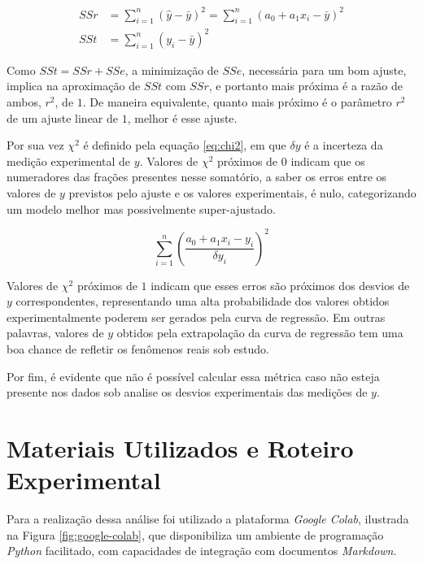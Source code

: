 \documentclass{article}
\begin{document}
\begin{align}
    \label{eq:ssr}
    SSr &= \sum_{i=1}^n \left(\hat y - \bar{y}\right)^2 = \sum_{i=1}^n \left(a_0 + a_1
    x_i - \bar{y}\right)^2 \\[1.5ex]
    \label{eq:sst}
    SSt &= \sum_{i = 1}^n \left(y_i - \bar{y}\right)^2
\end{align}

Como $SSt = SSr + SSe$, a minimização de $SSe$, necessária para um bom ajuste,
implica na aproximação de $SSt$ com $SSr$, e portanto mais próxima é a razão de
ambos, $r^2$, de $1$. De maneira equivalente, quanto mais próximo é o parâmetro
$r^2$ de um ajuste linear de $1$, melhor é esse ajuste.

Por sua vez $\chi^2$ é definido pela equação \eqref{eq:chi2}, em que $\delta y$
é a incerteza da medição experimental de $y$. Valores de $\chi^2$ próximos de
$0$ indicam que os numeradores das frações presentes nesse somatório, a saber os
erros entre os valores de $y$ previstos pelo ajuste e os valores experimentais,
é nulo, categorizando um modelo melhor mas possivelmente super-ajustado.

\begin{equation}
    \label{eq:chi2}
    \sum_{i=1}^n \left(\frac{a_0 + a_1x_i - y_i}{\delta y_i}\right)^2
\end{equation}

Valores de $\chi^2$ próximos de $1$ indicam que esses erros são próximos dos
desvios de $y$ correspondentes, representando uma alta probabilidade dos valores
obtidos experimentalmente poderem ser gerados pela curva de regressão. Em outras
palavras, valores de $y$ obtidos pela extrapolação da curva de regressão tem uma
boa chance de refletir os fenômenos reais sob estudo.

Por fim, é evidente que não é possível calcular essa métrica caso não esteja
presente nos dados sob analise os desvios experimentais das medições de $y$.

\clearpage

\section{Materiais Utilizados e Roteiro Experimental}

Para a realização dessa análise foi utilizado a plataforma \textit{Google
Colab}, ilustrada na Figura \ref{fig:google-colab}, que disponibiliza um
ambiente de programação \textit{Python} facilitado, com capacidades de
integração com documentos \textit{Markdown}.
\end{document}
